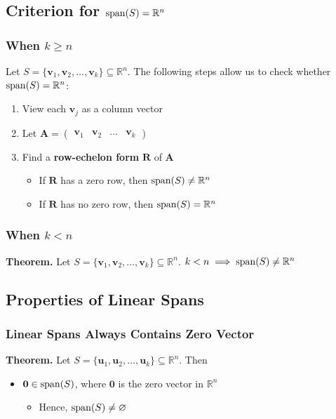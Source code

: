 \documentclass[../ma2001_notes.tex]{subfiles}
\begin{document}
\subsection[\texorpdfstring{Criterion for $\vspan(S)=\mathbb{R}^n$}{Criterion for Span Equals to Euclidean n-Space}]{Criterion for $\vspan(S)=\mathbb{R}^n$}

\subsubsection{When $k\geq n$}
Let \(S=\{\bm{v}_1,\bm{v}_2,\ldots,\bm{v}_k\}\subseteq\mathbb{R}^n\). The following steps allow us to check whether \(\vspan(S)=\mathbb{R}^n\):
\begin{enumerate}
	\item View each \(\bm{v}_j\) as a column vector
	\item Let \(\bm{A}=\begin{pmatrix}
		\bm{v}_1 & \bm{v}_2 & \ldots & \bm{v}_k
	\end{pmatrix}\)
	\item Find a \textbf{row-echelon form} \(\bm{R}\) of \(\bm{A}\)
	\begin{itemize}
		\item If \(\bm{R}\) has a zero row, then \(\operatorname{span}(S)\ne\mathbb{R}^n\)
		\item If \(\bm{R}\) has no zero row, then \(\vspan(S)=\mathbb{R}^n\)
	\end{itemize}
\end{enumerate}

\subsubsection{When $k<n$}
\textbf{Theorem.} Let \(S=\{\bm{v}_1,\bm{v}_2,\ldots,\bm{v}_k\}\subseteq\mathbb{R}^n\). \(k<n\implies\operatorname{span}(S)\ne\mathbb{R}^n\)

\subsection{Properties of Linear Spans}
\subsubsection{Linear Spans Always Contains Zero Vector}
\textbf{Theorem.} Let \(S=\{\bm{u}_1,\bm{u}_2,\ldots,\bm{u}_k\}\subseteq\mathbb{R}^n\). Then
\begin{itemize}
	\item\(\bm{0}\in\operatorname{span}(S)\), where \(\bm{0}\) is the zero vector in \(\mathbb{R}^n\)
	\begin{itemize}
		\item Hence, \(\operatorname{span}(S)\ne\varnothing\)
	\end{itemize}
\end{itemize}
\end{document}
